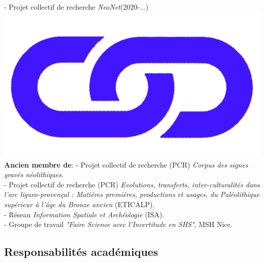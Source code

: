 \documentclass{article}
\begin{document}
- Projet collectif de recherche \textit{NeoNet}(2020-...) \href{https://redneonet.com/}{\includegraphics[scale=0.02]{link_darkblue.png}}\\
\smallbreak
\textbf{Ancien membre de}:
\smallbreak
- Projet collectif de recherche (PCR) \textit{Corpus des signes grav\'{e}s n\'{e}olithiques}.\\
- Projet collectif de recherche (PCR) \textit{Evolutions, transferts, inter-culturalit\'{e}s dans l'arc liguro-proven\c{c}al : Mati\'{e}res premi\'{e}res, productions et usages, du Pal\'{e}olithique sup\'{e}rieur \`{a} l'\^{a}ge du Bronze ancien} (ETICALP).\\
- Réseau \textit{Information Spatiale et Arch\'{e}ologie} (ISA).\\ 
- Groupe de travail \textit{"Faire Science avec l'Incertitude en SHS"}, MSH Nice.\\ 

\subsection*{Responsabilités académiques}
\end{document}
